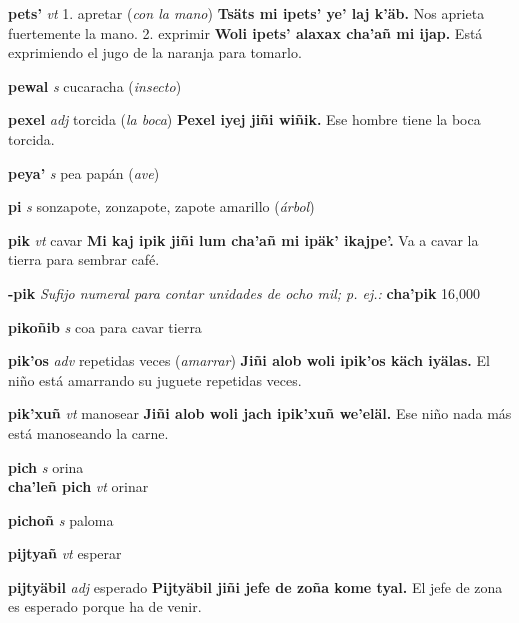 \documentclass[10pt]{scrbook}
\newcommand{\entry}[1]{\textbf{#1}}
\newcommand{\onedefinition}[1]{#1.}
\newcommand{\nontranslationdef}[1]{\textit{#1}}
\newcommand{\partofspeech}[1]{\textit{#1}}
\newcommand{\spanishtranslation}[1]{#1}
\newcommand{\clarification}[1]{(\textit{#1})}
\newcommand{\cholexample}[1]{\textbf{#1}}
\newcommand{\exampletranslation}[1]{#1}
\newcommand{\secondaryentry}[1]{\\\textbf{#1}}
\newcommand{\secondpartofspeech}[1]{\textit{#1}}
\newcommand{\secondtranslation}[1]{#1}
\begin{document}
\begin{multicols}{2}
\entry{pets'}
\partofspeech{vt}
\onedefinition{1}
\spanishtranslation{apretar}
\clarification{con la mano}
\cholexample{Tsäts mi ipets' ye' laj k'äb.}
\exampletranslation{Nos aprieta fuertemente la mano.}
\onedefinition{2}
\spanishtranslation{exprimir}
\cholexample{Woli ipets' alaxax cha'añ mi ijap.}
\exampletranslation{Está exprimiendo el jugo de la naranja para tomarlo.}

\entry{pewal}
\partofspeech{s}
\spanishtranslation{cucaracha}
\clarification{insecto}

\entry{pexel}
\partofspeech{adj}
\spanishtranslation{torcida}
\clarification{la boca}
\cholexample{Pexel iyej jiñi wiñik.}
\exampletranslation{Ese hombre tiene la boca torcida.}

\entry{peya'}
\partofspeech{s}
\spanishtranslation{pea}
\spanishtranslation{papán}
\clarification{ave}

\entry{pi}
\partofspeech{s}
\spanishtranslation{sonzapote, zonzapote, zapote amarillo}
\clarification{árbol}

\entry{pik}
\partofspeech{vt}
\spanishtranslation{cavar}
\cholexample{Mi kaj ipik jiñi lum cha'añ mi ipäk' ikajpe'.}
\exampletranslation{Va a cavar la tierra para sembrar café.}

\entry{-pik}
\nontranslationdef{Sufijo numeral para contar unidades de ocho mil; p. ej.:}
\cholexample{cha'pik}
\exampletranslation{16,000}

\entry{pikoñib}
\partofspeech{s}
\spanishtranslation{coa para cavar tierra}

\entry{pik'os}
\partofspeech{adv}
\spanishtranslation{repetidas veces}
\clarification{amarrar}
\cholexample{Jiñi alob woli ipik'os käch iyälas.}
\exampletranslation{El niño está amarrando su juguete repetidas veces.}

\entry{pik'xuñ}
\partofspeech{vt}
\spanishtranslation{manosear}
\cholexample{Jiñi alob woli jach ipik'xuñ we'eläl.}
\exampletranslation{Ese niño nada más está manoseando la carne.}

\entry{pich}
\partofspeech{s}
\spanishtranslation{orina}
\secondaryentry{cha'leñ pich}
\secondpartofspeech{vt}
\secondtranslation{orinar}

\entry{pichoñ}
\partofspeech{s}
\spanishtranslation{paloma}

\entry{pijtyañ}
\partofspeech{vt}
\spanishtranslation{esperar}

\entry{pijtyäbil}
\partofspeech{adj}
\spanishtranslation{esperado}
\cholexample{Pijtyäbil jiñi jefe de zoña kome tyal.}
\exampletranslation{El jefe de zona es esperado porque ha de venir.}


\end{multicols}
\end{document}
